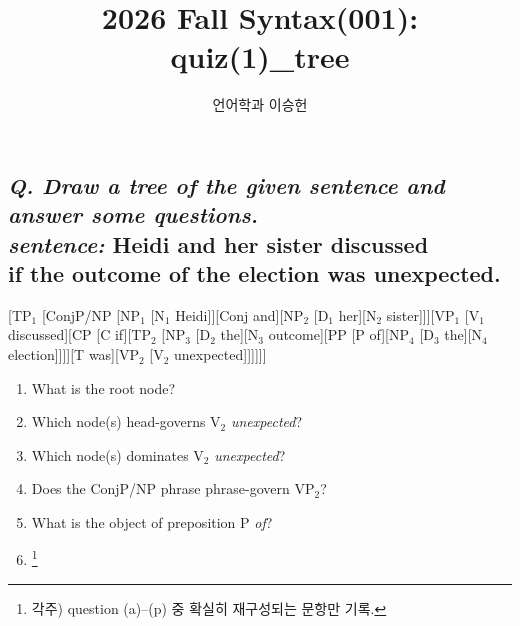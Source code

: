 \documentclass[11pt]{article}
\title{2026 Fall Syntax(001): \\ quiz(1)\_tree}
\author{언어학과 이승헌}
\begin{document}
\maketitle
\bigskip
\begin{centering}
\section{\Large{\textit{Q. Draw a tree of the given sentence and answer some questions.}} \\ 
\bigskip
\large{\textit{sentence:} Heidi and her sister discussed \\ if the outcome of the election was unexpected.}} 
\bigskip
\end{centering}

\noindent
\centering
\begin{gpstree}{}
[TP$_1$ [ConjP/NP [NP$_1$ [N$_1$ Heidi]][Conj and][NP$_2$ [D$_1$ her][N$_2$ sister]]][VP$_1$ [V$_1$ discussed][CP [C if][TP$_2$ [NP$_3$ [D$_2$ the][N$_3$ outcome][PP [P of][NP$_4$ [D$_3$ the][N$_4$ election]]]][T was][VP$_2$ [V$_2$ unexpected]]]]]]
\end{gpstree}

\begin{enumerate}
  \item [a.] What is the root node?
  \item [b.] Which node(s) head-governs V$_2$ \textit{unexpected}?
  \item [c.] Which node(s) dominates V$_2$ \textit{unexpected}?
  \item [d.] Does the ConjP/NP phrase phrase-govern VP$_2$?
  \item [e.] What is the object of preposition P \textit{of}?
  \item [...] \footnote{각주) question (a)--(p) 중 확실히 재구성되는 문항만 기록.}
\end{enumerate}
\end{document}
